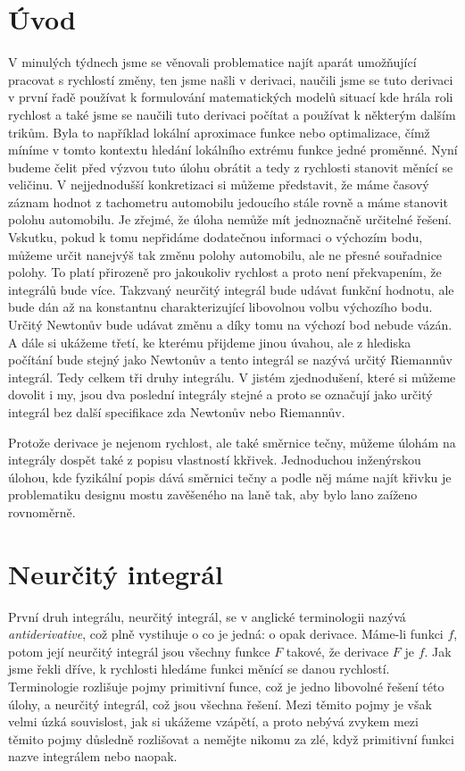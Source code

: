 \documentclass[12pt]{article}
\begin{document}
\section*{Úvod}

V minulých týdnech jsme se věnovali problematice najít aparát umožňující pracovat s rychlostí změny, ten jsme našli v derivaci, naučili jsme se tuto derivaci v první řadě používat k formulování matematických modelů situací kde hrála roli rychlost a také jsme se naučili tuto derivaci počítat a používat k některým dalším trikům. Byla to například lokální aproximace funkce nebo optimalizace, čímž míníme v tomto kontextu hledání lokálního extrému funkce jedné proměnné. Nyní budeme čelit před výzvou tuto úlohu obrátit a tedy z rychlosti stanovit měnící se veličinu. V nejjednodušší konkretizaci si můžeme představit, že máme časový záznam hodnot z tachometru automobilu jedoucího stále rovně a máme stanovit polohu automobilu. Je zřejmé, že úloha nemůže mít jednoznačně určitelné řešení. Vskutku, pokud k tomu nepřidáme dodatečnou informaci o výchozím bodu, můžeme určit nanejvýš tak změnu polohy automobilu, ale ne přesné souřadnice polohy. To platí přirozeně pro jakoukoliv rychlost a proto není překvapením, že integrálů bude více. Takzvaný neurčitý integrál bude udávat funkční hodnotu, ale bude dán až na konstantnu charakterizující libovolnou volbu výchozího bodu. Určitý Newtonův bude udávat změnu a díky tomu na výchozí bod nebude vázán. A dále si ukážeme třetí, ke kterému přijdeme jinou úvahou, ale z hlediska počítání bude stejný jako Newtonův a tento integrál se nazývá určitý Riemannův integrál. Tedy celkem tři druhy integrálu. V jistém zjednodušení, které si můžeme dovolit i my, jsou dva poslední integrály stejné a proto se označují jako určitý integrál bez další specifikace zda Newtonův nebo Riemannův.

Protože derivace je nejenom rychlost, ale také směrnice tečny, můžeme  úlohám na integrály dospět také z popisu vlastností kkřivek. Jednoduchou inženýrskou úlohou, kde fyzikální popis dává směrnici tečny a podle něj máme najít křivku je problematiku designu mostu zavěšeného na laně tak, aby bylo lano zaíženo rovnoměrně.


\section*{Neurčitý integrál}

První druh integrálu, neurčitý integrál, se v anglické terminologii nazývá \textit{antiderivative}, což plně vystihuje o co je jedná: o opak derivace. Máme-li funkci $f$, potom její neurčitý integrál jsou všechny funkce $F$ takové, že derivace $F$ je $f$. Jak jsme řekli dříve, k rychlosti hledáme funkci měnící se danou rychlostí. Terminologie rozlišuje pojmy primitivní funce, což je jedno libovolné řešení této úlohy, a neurčitý integrál, což jsou všechna řešení. Mezi těmito pojmy je však velmi úzká souvislost, jak si ukážeme vzápětí, a proto nebývá zvykem mezi těmito pojmy důsledně rozlišovat a nemějte nikomu za zlé, když primitivní funkci nazve integrálem nebo naopak. 
\end{document}
